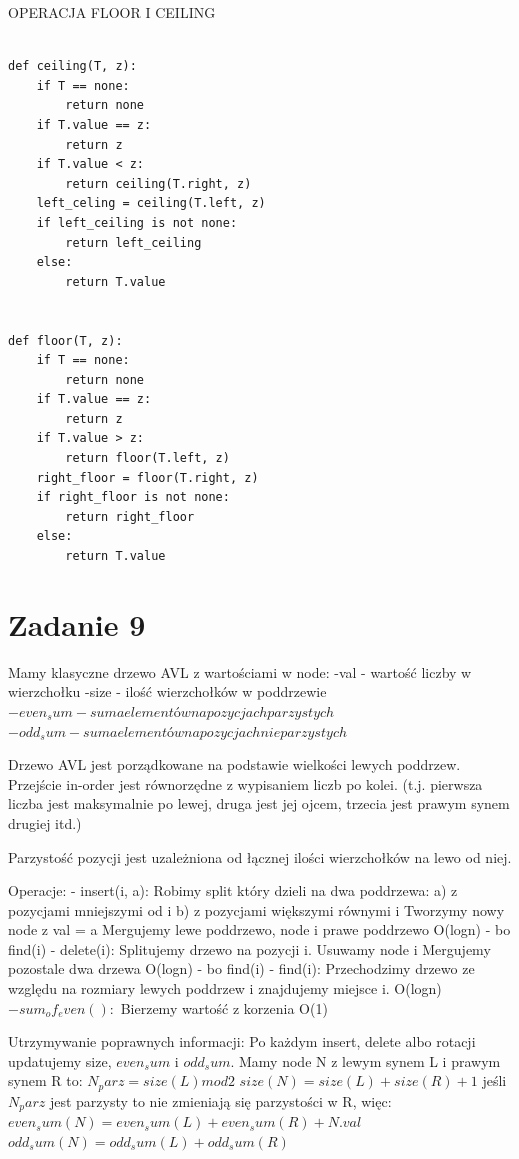 \documentclass[12pt]{article}
\begin{document}
OPERACJA FLOOR I CEILING
\begin{lstlisting}

def ceiling(T, z):
    if T == none:
        return none 
    if T.value == z:
        return z 
    if T.value < z:
        return ceiling(T.right, z)
    left_celing = ceiling(T.left, z)
    if left_ceiling is not none:
        return left_ceiling
    else:
        return T.value 


def floor(T, z):
    if T == none:
        return none 
    if T.value == z:
        return z 
    if T.value > z:
        return floor(T.left, z)
    right_floor = floor(T.right, z)
    if right_floor is not none:
        return right_floor
    else:
        return T.value 
\end{lstlisting}


\section{Zadanie 9}
Mamy klasyczne drzewo AVL z wartościami w node:
-val - wartość liczby w wierzchołku
-size - ilość wierzchołków w poddrzewie 
$-even_sum - suma elementów na pozycjach parzystych $
$-odd_sum - suma elementów na pozycjach nieparzystych $

Drzewo AVL jest porządkowane na podstawie wielkości lewych poddrzew. Przejście in-order jest równorzędne z wypisaniem liczb po kolei. (t.j. pierwsza liczba jest maksymalnie po lewej, druga jest jej ojcem, trzecia jest prawym synem drugiej itd.)

Parzystość pozycji jest uzależniona od łącznej ilości wierzchołków na lewo od niej.

Operacje:
- insert(i, a):
Robimy split który dzieli na dwa poddrzewa:
a) z pozycjami mniejszymi od i 
b) z pozycjami większymi równymi i 
Tworzymy nowy node z val = a 
Mergujemy lewe poddrzewo, node i prawe poddrzewo 
O(logn) - bo find(i)
- delete(i):
Splitujemy drzewo na pozycji i.
Usuwamy node i
Mergujemy pozostale dwa drzewa 
O(logn) - bo find(i)
- find(i):
Przechodzimy drzewo ze względu na rozmiary lewych poddrzew i znajdujemy miejsce i.
O(logn)
$-sum_of_even():$
Bierzemy wartość z korzenia 
O(1)

Utrzymywanie poprawnych informacji:
Po każdym insert, delete albo rotacji updatujemy size, $even_sum$ i $odd_sum$.
Mamy node N z lewym synem L i prawym synem R to:
$N_parz = size(L) mod 2$
$size(N) = size(L) + size(R) + 1$
jeśli $N_parz$ jest parzysty to nie zmieniają się parzystości w R, więc:
$even_sum(N) = even_sum(L) + even_sum(R) + N.val $
$odd_sum(N) = odd_sum(L) + odd_sum(R)$
\end{document}
